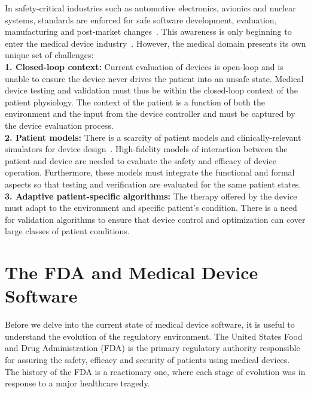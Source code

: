 In safety-critical industries such as automotive electronics, avionics and nuclear systems, standards are enforced for safe software development, evaluation, manufacturing and post-market changes~\cite{autosar, AVSI}. This awareness is only beginning to enter the medical device industry~\cite{formal_fda}. However, the medical domain presents its own unique set of challenges:\\
\textbf{1. Closed-loop context:} Current evaluation of devices is open-loop and is unable to ensure the device never drives the patient into an unsafe state. Medical device testing and validation must thus be within the closed-loop context of the patient physiology. The context of the patient is a function of both the environment and the input from the device controller and must be captured by the device evaluation process.\\ 
\textbf{2. Patient models:} There is a scarcity of patient models and clinically-relevant simulators for device design~\cite{pat-model}. High-fidelity models of interaction between the patient and device are needed to evaluate the safety and efficacy of device operation. Furthermore, these models must integrate the functional and formal aspects so that testing and verification are evaluated for the same patient states.\\
\textbf{3. Adaptive patient-specific algorithms:} The therapy offered by the device must adapt to the environment and specific patient's condition. There is a need for validation algorithms to ensure that device control and optimization can cover large classes of patient conditions. 

\section{The FDA and Medical Device Software}
Before we delve into the current state of medical device software, it is useful to understand the evolution of the regulatory environment. The United States Food and Drug Administration (FDA) is the primary regulatory authority responsible for assuring the safety, efficacy and security of patients using medical devices. The history of the FDA is a reactionary one, where each stage of evolution was in response to a major healthcare tragedy. 

